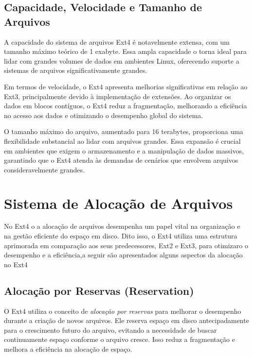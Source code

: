 \documentclass[
	12pt,				%
	openright,			%
	oneside,			%
	a4paper,			%
	chapter=TITLE,		%
	english,			%
	french,				%
	spanish,			%
	brazil				%
	]{abntex2}
\theoremstyle{definition}
\begin{document}
\section{Capacidade, Velocidade e Tamanho de Arquivos}
A capacidade do sistema de arquivos Ext4 é notavelmente extensa, com um tamanho máximo teórico de 1 exabyte. Essa 
ampla capacidade o torna ideal para lidar com grandes volumes de dados em ambientes Linux, oferecendo suporte a 
sistemas de arquivos significativamente grandes.

Em termos de velocidade, o Ext4 apresenta melhorias significativas em relação ao Ext3, principalmente devido 
à implementação de extensões. Ao organizar os dados em blocos contíguos, o Ext4 reduz a fragmentação, melhorando 
a eficiência no acesso aos dados e otimizando o desempenho global do sistema.

O tamanho máximo do arquivo, aumentado para 16 terabytes, proporciona uma flexibilidade substancial ao lidar 
com arquivos grandes. Essa expansão é crucial em ambientes que exigem o armazenamento e a manipulação de dados 
massivos, garantindo que o Ext4 atenda às demandas de cenários que envolvem arquivos consideravelmente grandes.


\chapter{Sistema de Alocação de Arquivos}
No Ext4 o a alocação de arquivos desempenha um papel vital na organização e na gestão eficiente do espaço em disco. 
Dito isso, o Ext4 utiliza uma estrutura aprimorada em comparação aos seus predecessores, Ext2 e Ext3, para otimizaro 
o desempenho e a eficiência,a seguir são apresentados alguns aspectos da alocação no Ext4


\section{Alocação por Reservas (Reservation)}
O Ext4 utiliza o conceito de \textit{alocação por reservas} para 
melhorar o desempenho durante a criação de novos arquivos. Ele reserva espaço em disco antecipadamente para o crescimento futuro do arquivo, evitando a necessidade de buscar continuamente espaço conforme o arquivo cresce. Isso reduz a fragmentação e melhora a eficiência na alocação de espaço.
\end{document}
